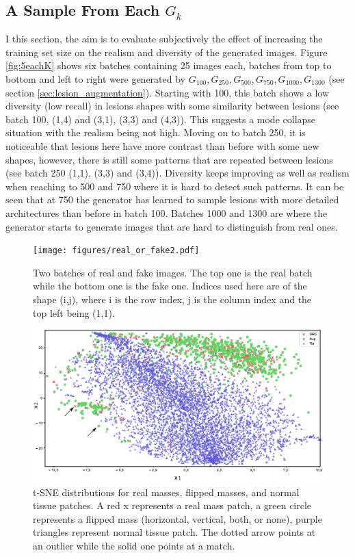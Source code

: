 \documentclass[final,3p,twocolumn,authoryear,sort&compress,times]{maia}
\begin{document}
\subsection{A Sample From Each $G_k$}
\label{annex:5eachK}
I this section, the aim is to evaluate subjectively the effect of increasing the training set size on the realism and diversity of the generated images. Figure \ref{fig:5eachK} shows six batches containing 25 images each, batches from top to bottom and left to right were generated by $G_{100}, G_{250}, G_{500}, G_{750}, G_{1000}, G_{1300}$ (see section \ref{sec:lesion_augmentation}). Starting with 100, this batch shows a low diversity (low recall) in lesions shapes with some similarity between lesions (see batch 100, (1,4) and (3,1), (3,3) and (4,3)). This suggests a mode collapse situation with the realism being not high. Moving on to batch 250, it is noticeable that lesions here have more contrast than before with some new shapes, however, there is still some patterns that are repeated between lesions (see batch 250 (1,1), (3,3) and (3,4)). Diversity keeps improving as well as realism when reaching to 500 and 750 where it is hard to detect such patterns. It can be seen that at 750 the generator has learned to sample lesions with more detailed architectures than before in batch 100. Batches 1000 and 1300 are where the generator starts to generate images that are hard to distinguish from real ones.

\begin{figure}
    \centering
    \texttt{[image: figures/real\_or\_fake2.pdf]}
    \caption{Two batches of real and fake images. The top one is the real batch while the bottom one is the fake one. Indices used here are of the shape (i,j), where i is the row index, j is the column index and the top left being (1,1). }
    \label{fig:real_or_fake}
\end{figure}

\begin{figure}
\centering
\includegraphics[scale=2]{figures/tSNE_real_aug_tis.pdf}
\caption{t-SNE distributions for real masses, flipped masses, and normal tissue patches. A red x represents a real mass patch, a green circle represents a flipped mass (horizontal, vertical, both, or none), purple triangles represent normal tissue patch. The dotted arrow points at an outlier while the solid one points at a match.}
\label{fig:tSNE_real_aug_tis}
\end{figure}
\end{document}
